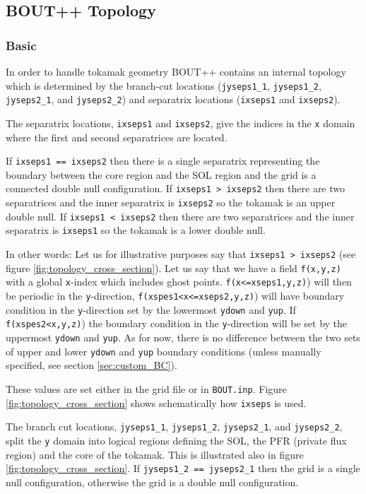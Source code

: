 \documentclass[12pt]{article}
\newcommand{\code}[1]{\texttt{#1}}
\begin{document}
\subsection{BOUT++ Topology}
%


\subsubsection{Basic}
%
In order to handle tokamak geometry BOUT++ contains an internal topology which
is determined by the branch-cut locations (\code{jyseps1\_1},
\code{jyseps1\_2}, \code{jyseps2\_1}, and \code{jyseps2\_2}) and separatrix
locations (\code{ixseps1} and  \code{ixseps2}).

The separatrix locations, \code{ixseps1} and  \code{ixseps2}, give the indices
in the \code{x} domain where the first and second separatrices are located.

If \code{ixseps1 == ixseps2} then there is a single separatrix representing the
boundary between the core region and the SOL region and the grid is a connected
double null configuration. If \code{ixseps1 > ixseps2} then there are two
separatrices and the inner separatrix is \code{ixseps2} so the tokamak is an
upper double null. If \code{ixseps1 < ixseps2} then there are two separatrices
and the inner separatrix is \code{ixseps1} so the tokamak is a lower double
null.

In other words: Let us for illustrative purposes say that \code{ixseps1 >
ixseps2} (see figure \ref{fig:topology_cross_section}). Let us say that we have
a field \code{f(x,y,z)} with a global \code{x}-index which includes ghost
points. \code{f(x<=xseps1,y,z)}) will then be periodic in the
\code{y}-direction, \code{f(xspes1<x<=xseps2,y,z)}) will have boundary
condition in the \code{y}-direction set by the lowermost \code{ydown} and
\code{yup}.  If \code{f(xspes2<x,y,z)}) the boundary condition in the
\code{y}-direction will be set by the uppermost \code{ydown} and \code{yup}. As
for now, there is no difference between the two sets of upper and lower
\code{ydown} and \code{yup} boundary conditions (unless manually specified, see
section \ref{sec:custom_BC}).

These values are set either in the grid file or in \code{BOUT.inp}. Figure
\ref{fig:topology_cross_section} shows schematically how \code{ixseps} is used.

The branch cut locations, \code{jyseps1\_1}, \code{jyseps1\_2},
\code{jyseps2\_1}, and \code{jyseps2\_2}, split the \code{y} domain into
logical regions defining the SOL, the PFR (private flux region) and the core of
the tokamak. This is illustrated also in figure
\ref{fig:topology_cross_section}.  If \code{jyseps1\_2 == jyseps2\_1} then the
grid is a single null configuration, otherwise the grid is a double null
configuration.
\end{document}
